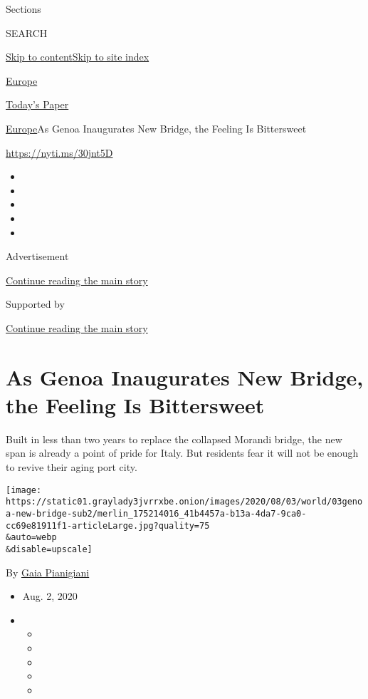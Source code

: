Sections

SEARCH

\protect\hyperlink{site-content}{Skip to
content}\protect\hyperlink{site-index}{Skip to site index}

\href{https://www.nytimes3xbfgragh.onion/section/world/europe}{Europe}

\href{https://myaccount.nytimes3xbfgragh.onion/auth/login?response_type=cookie\&client_id=vi}{}

\href{https://www.nytimes3xbfgragh.onion/section/todayspaper}{Today's
Paper}

\href{/section/world/europe}{Europe}\textbar{}As Genoa Inaugurates New
Bridge, the Feeling Is Bittersweet

\url{https://nyti.ms/30jnt5D}

\begin{itemize}
\item
\item
\item
\item
\item
\end{itemize}

Advertisement

\protect\hyperlink{after-top}{Continue reading the main story}

Supported by

\protect\hyperlink{after-sponsor}{Continue reading the main story}

\hypertarget{as-genoa-inaugurates-new-bridge-the-feeling-is-bittersweet}{%
\section{As Genoa Inaugurates New Bridge, the Feeling Is
Bittersweet}\label{as-genoa-inaugurates-new-bridge-the-feeling-is-bittersweet}}

Built in less than two years to replace the collapsed Morandi bridge,
the new span is already a point of pride for Italy. But residents fear
it will not be enough to revive their aging port city.

\texttt{[image: https://static01.graylady3jvrrxbe.onion/images/2020/08/03/world/03genoa-new-bridge-sub2/merlin\_175214016\_41b4457a-b13a-4da7-9ca0-cc69e81911f1-articleLarge.jpg?quality=75\\\&auto=webp\\\&disable=upscale]}

By \href{https://www.nytimes3xbfgragh.onion/by/gaia-pianigiani}{Gaia
Pianigiani}

\begin{itemize}
\item
  Aug. 2, 2020
\item
  \begin{itemize}
  \item
  \item
  \item
  \item
  \item
  \end{itemize}
\end{itemize}

